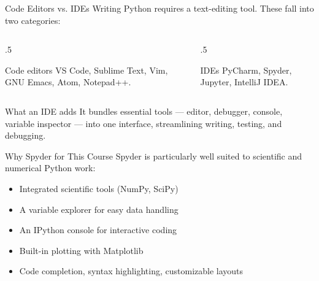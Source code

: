 \documentclass[9pt,aspectratio=169,xcolor=table]{beamer}
\begin{document}
\begin{frame}{Code Editors vs. IDEs}
    \leavevmode
    Writing Python requires a text-editing tool. These fall into two
    categories:

    \vspace{3mm}
    \begin{columns}[t]
        \begin{column}{.5\textwidth}
            \begin{block}{Code editors}
                \small VS Code, Sublime Text, Vim, GNU Emacs, Atom,
                Notepad++.
            \end{block}
        \end{column}
        \begin{column}{.5\textwidth}
            \begin{block}{IDEs}
                \small PyCharm, \alert{Spyder}, Jupyter, IntelliJ IDEA.
            \end{block}
        \end{column}
    \end{columns}

    \vspace{3mm}
    \begin{alertblock}{What an IDE adds}
        It bundles essential tools --- editor, debugger, console,
        variable inspector --- into one interface, streamlining writing,
        testing, and debugging.
    \end{alertblock}
\end{frame}

\begin{frame}{Why Spyder for This Course}
    \leavevmode
    Spyder is particularly well suited to \alert{scientific and
    numerical} Python work:

    \vspace{2mm}
    \begin{itemize}
        \item Integrated scientific tools (NumPy, SciPy)
        \item A \alert{variable explorer} for easy data handling
        \item An IPython console for interactive coding
        \item Built-in plotting with Matplotlib
        \item Code completion, syntax highlighting, customizable layouts
    \end{itemize}
\end{frame}
\end{document}
